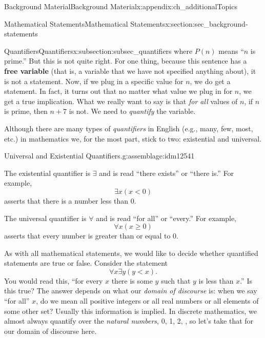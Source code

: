 \documentclass[oneside,10pt,]{book}
\newcommand{\terminology}[1]{\textbf{#1}}
\numberwithin{equation}{chapter}
\newcommand{\lt}{<}
\begin{document}
\begin{appendixptx}{Background Material}{}{Background Material}{}{}{x:appendix:ch_additionalTopics}
\begin{sectionptx}{Mathematical Statements}{}{Mathematical Statements}{}{}{x:section:sec_background-statements}
\begin{subsectionptx}{Quantifiers}{}{Quantifiers}{}{}{x:subsection:subsec_quantifiers}
where \(P(n)\) means ``\(n\) is prime.'' But this is not quite right. For one thing, because this sentence has a \terminology{free variable} (that is, a variable that we have not specified anything about), it is not a statement. Now, if we plug in a specific value for \(n\), we do get a statement. In fact, it turns out that no matter what value we plug in for \(n\), we get a true implication. What we really want to say is that \emph{for all} values of \(n\), if \(n\) is prime, then \(n+7\) is not. We need to \emph{quantify} the variable.%
\par
Although there are many types of \emph{quantifiers} in English (e.g., many, few, most, etc.) in mathematics we, for the most part, stick to two: existential and universal.%
\begin{assemblage}{Universal and Existential Quantifiers.}{g:assemblage:idm12541}%
%
\par
The existential quantifier is \(\exists\) and is read ``there exists'' or ``there is.'' For example, \label{g:notation:idm12555}%
\begin{equation*}
\exists x (x \lt 0)
\end{equation*}
asserts that there is a number less than 0.%
\par
The universal quantifier is \(\forall\) and is read ``for all'' or ``every.'' For example,  \label{g:notation:idm12568}%
\begin{equation*}
\forall x (x \ge 0)
\end{equation*}
asserts that every number is greater than or equal to 0.%
\end{assemblage}
As with all mathematical statements, we would like to decide whether quantified statements are true or false. Consider the statement%
\begin{equation*}
\forall x \exists y (y \lt x).
\end{equation*}
You would read this, ``for every \(x\) there is some \(y\) such that \(y\) is less than \(x\).'' Is this true? The answer depends on what our \emph{domain of discourse} is: when we say ``for all'' \(x\), do we mean all positive integers or all real numbers or all elements of some other set? Usually this information is implied. In discrete mathematics, we almost always quantify over the \emph{natural numbers}, 0, 1, 2, \textellipsis{}, so let's take that for our domain of discourse here.%
\par

\end{subsectionptx}
\end{sectionptx}
\end{appendixptx}
\end{document}
